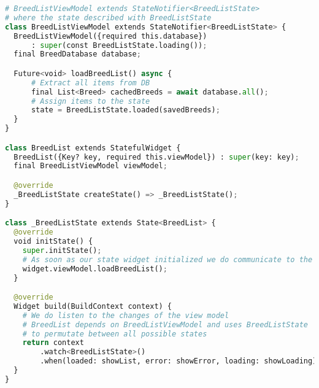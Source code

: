 \begin{lstlisting}[style=light, language=Python,label={lst:flutter_sqflite},caption=Flutter SQFLITE]
# BreedListViewModel extends StateNotifier<BreedListState>
# where the state described with BreedListState
class BreedListViewModel extends StateNotifier<BreedListState> {
  BreedListViewModel({required this.database})
      : super(const BreedListState.loading());
  final BreedDatabase database;

  Future<void> loadBreedList() async {
      # Extract all items from DB
      final List<Breed> cachedBreeds = await database.all();
      # Assign items to the state
      state = BreedListState.loaded(savedBreeds);
  }
}

class BreedList extends StatefulWidget {
  BreedList({Key? key, required this.viewModel}) : super(key: key);
  final BreedListViewModel viewModel;

  @override
  _BreedListState createState() => _BreedListState();
}

class _BreedListState extends State<BreedList> {
  @override
  void initState() {
    super.initState();
    # As soon as our state widget initialized we do communicate to the view model
    widget.viewModel.loadBreedList();
  }

  @override
  Widget build(BuildContext context) {
    # We do listen to the changes of the view model
    # BreedList depends on BreedListViewModel and uses BreedListState
    # to permutate between all possible states
    return context
        .watch<BreedListState>()
        .when(loaded: showList, error: showError, loading: showLoading);
  }
}
\end{lstlisting}

